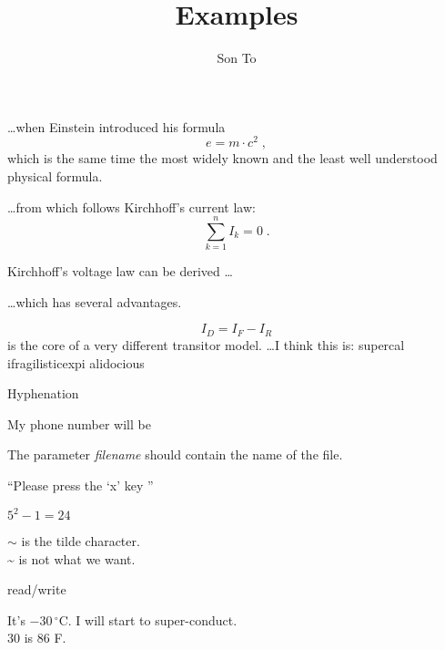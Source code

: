 \documentclass[a4paper]{report}
\title{Examples}
\author{Son To}
\begin{document}
\maketitle
  \ldots when Einstein introduced his formula
  \begin{equation}
    e = m \cdot c^2 \; ,
  \end{equation}
  which is the same time the most widely known
  and the least well understood physical formula.

  \ldots from which follows Kirchhoff's current law:
  \begin{equation}
    \sum_{k=1}^{n} I_k = 0 \; .
  \end{equation}

  Kirchhoff's voltage law can be derived \ldots

  \ldots which has several advantages.

  \begin{equation}
    I_D = I_F - I_R
  \end{equation}
  is the core of a very different transitor model. \ldots  I think this is:
  su\-per\-cal\-%
  i\-frag\-i\-lis\-tic\-ex\-pi\-%
  al\-i\-do\-cious

  Hyphenation

  My phone number will be 

  The parameter \mbox{\emph{filename}} should contain
  the name of the file.

  ``Please press the `x' key ''

  $5^2-1=24$

  $\sim$ is the tilde character. \\
  \~{} is not what we want.

  read\slash write %

  It's $-30\,^{\circ}\mathrm{C}$. I will start to
  super-conduct.\\
  30 \textcelsius{} is 86 \textdegree{}F.
\end{document}
